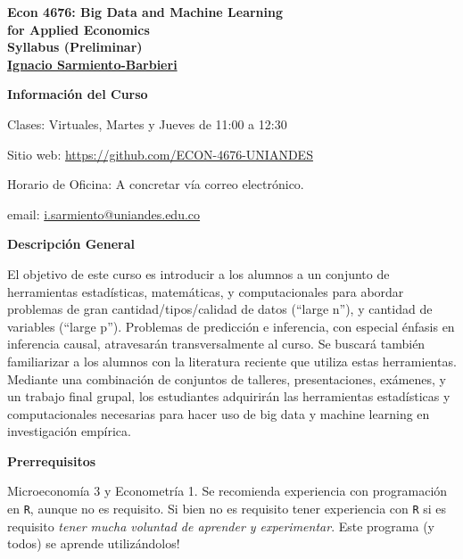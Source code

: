 \documentclass[11pt]{article}
\begin{document}


\begin{centering}
{\bf \Large Econ 4676: Big Data and Machine Learning \\ for Applied Economics}\\
{\bf \Large Syllabus (Preliminar)}\\
{\bf  \href{https://ignaciomsarmiento.github.io/}{Ignacio Sarmiento-Barbieri}}

\end{centering}


\bigskip

{\bf \Large  Información del Curso}
\medskip

Clases: Virtuales, Martes y Jueves de 11:00 a 12:30

Sitio web: \url{https://github.com/ECON-4676-UNIANDES}

Horario de Oficina: A concretar vía  correo electrónico.

email: \href{mailto:i.sarmiento@uniandes.edu.co}{i.sarmiento@uniandes.edu.co}

\bigskip

{\bf \Large  Descripción General}

\medskip

El objetivo  de  este  curso  es  introducir  a  los  alumnos a  un  conjunto  de  herramientas  estadísticas, matemáticas, y computacionales para abordar problemas de gran cantidad/tipos/calidad de datos (“large n”), y cantidad de variables (“large p”). Problemas de predicción e inferencia, con especial énfasis en inferencia causal, atravesarán transversalmente al curso. Se buscará también familiarizar a los alumnos con la literatura reciente que utiliza estas herramientas. Mediante una combinación de  conjuntos  de  talleres,  presentaciones, exámenes, y  un  trabajo  final  grupal,  los  estudiantes  adquirirán  las herramientas  estadísticas  y  computacionales  necesarias  para  hacer  uso  de  big  data  y  machine learning en investigación empírica.




\bigskip

{\bf \Large Prerrequisitos}

\medskip
Microeconomía 3 y Econometría 1. Se recomienda experiencia con programación en {\texttt R}, aunque no es requisito. Si bien no es requisito tener experiencia con {\texttt R} si es requisito {\it tener mucha voluntad de aprender y experimentar}. Este programa (y todos) se aprende utilizándolos!
\end{document}
